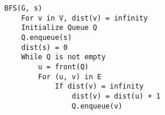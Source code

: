 \documentclass[letterpaper]{article}
\begin{document}
\begin{mdframed}[]
    \begin{verbatim}
        BFS(G, s)
            For v in V, dist(v) = infinity 
            Initialize Queue Q
            Q.enqueue(s)
            dist(s) = 0
            While Q is not empty
                u = front(Q)
                For (u, v) in E
                    If dist(v) = infinity
                        dist(v) = dist(u) + 1
                        Q.enqueue(v)\end{verbatim}
\end{mdframed}
\end{document}
